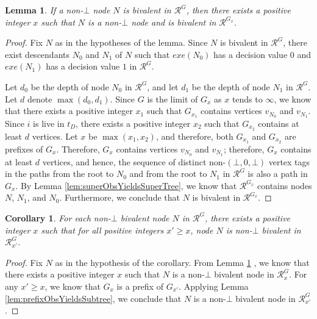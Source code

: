 \documentclass[11pt]{article}
\numberwithin{theorem}{section}
\newtheorem{lemma}[theorem]{Lemma}
\newtheorem{corollary}[theorem]{Corollary}
\begin{document}
\begin{lemma}\label{lem:bivalentNodeFiniteTimeInAllGs}
If a non-$\bot$ node $N$ is bivalent in $\mathcal{R}^{G}$, then there exists a positive integer $x$ such that $N$ is a non-$\bot$ node and is bivalent in $\mathcal{R}^{G_x}$.
\end{lemma}
\begin{proof}
Fix $N$ as in the hypotheses of the lemma. Since $N$ is bivalent in $\mathcal{R}^{G}$, there exist descendants $N_0$ and $N_1$ of $N$ such that $exe(N_0)$ has a decision value $0$ and $exe(N_1)$ has a decision value $1$ in $\mathcal{R}^{G}$. 

Let $d_0$ be the depth of node $N_{0}$ in $\mathcal{R}^{G}$, and let $d_1$ be the depth of node $N_{1}$ in $\mathcal{R}^{G}$. Let $d$ denote $\max(d_0,d_1)$. Since $G$ is the limit of $G_x$ as $x$ tends to $\infty$, we know that there exists a positive integer $x_1$ such that $G_{x_1}$ contains vertices $v_{N_{0}}$ and $v_{N_{1}}$. Since $i$ is live in $t_D$, there exists a positive integer $x_2$ such that $G_{x_2}$ contains at least $d$ vertices. Let $x$ be $\max(x_1,x_2)$, and therefore,  both $G_{x_1}$ and $G_{x_2}$ are prefixes of $G_x$. Therefore, $G_x$ contains vertices $v_{N_{0}}$ and $v_{N_{1}}$; therefore, $G_x$ contains at least $d$ vertices, and hence, the sequence of distinct non-$(\bot, 0, \bot)$ vertex tags in the paths from the root to $N_0$ and from the root to $N_1$ in $\mathcal{R}^{G}$ is also a path in $G_x$. By Lemma \ref{lem:superObsYieldsSuperTree}, we know that $\mathcal{R}^{G_x}$ contains nodes $N$, $N_{1}$, and $N_{0}$. Furthermore, we conclude that $N$ is bivalent in $\mathcal{R}^{G_x}$.
\end{proof}

\begin{corollary}\label{cor:bivalentNodeFiniteTimeInAllGs}
For each non-$\bot$ bivalent node $N$ in $\mathcal{R}^{G}$, there exists a positive integer $x$ such that for all positive integers $x' \geq x$, node $N$ is non-$\bot$ bivalent in $\mathcal{R}^G_{x'}$.
\end{corollary}
\begin{proof}
Fix $N$ as in the hypothesis of the corollary. From Lemma \ref{lem:bivalentNodeFiniteTimeInAllGs} , we know that there exists a positive integer $x$ such that $N$ is a non-$\bot$ bivalent node in $\mathcal{R}^G_x$. For any $x' \geq x$, we know that 
$G_x$ is a prefix of $G_{x'}$.
Applying Lemma \ref{lem:prefixObsYieldsSubtree}, we conclude that $N$ is a non-$\bot$ bivalent node in $\mathcal{R}^G_{x'}$.
\end{proof}
\end{document}
